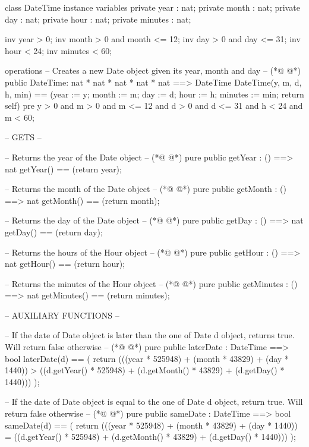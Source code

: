 \begin{vdmpp}[breaklines=true]
class DateTime
 instance variables
   private year : nat;
   private month : nat;
   private day : nat;
   private hour : nat;
   private minutes : nat;
   
   inv year > 0;
   inv month > 0 and month <= 12;
   inv day > 0 and day <= 31;
   inv hour < 24;
   inv minutes < 60;
   
 operations  
   -- Creates a new Date object given its year, month and day --
(*@
\label{DateTime:17}
@*)
   public DateTime: nat * nat * nat * nat * nat ==> DateTime
      DateTime(y, m, d, h, min) == (year := y; month := m; day := d; hour := h; minutes := min; return self)
      pre y > 0 and m > 0 and m <= 12 and d > 0 and d <= 31 and h < 24 and m < 60;
     
   -- GETS --
  
   -- Returns the year of the Date object --
(*@
\label{getYear:24}
@*)
   pure public getYear : () ==> nat
    getYear() == (return year); 
   
   -- Returns the month of the Date object --
(*@
\label{getMonth:28}
@*)
   pure public getMonth : () ==> nat
    getMonth() == (return month); 
   
   -- Returns the day of the Date object --
(*@
\label{getDay:32}
@*)
   pure public getDay : () ==> nat
    getDay() == (return day);

   -- Returns the hours of the Hour object --
(*@
\label{getHour:36}
@*)
   pure public getHour : () ==> nat
    getHour() == (return hour);
    
   -- Returns the minutes of the Hour object --
(*@
\label{getMinutes:40}
@*)
   pure public getMinutes : () ==> nat
    getMinutes() == (return minutes);
     

   -- AUXILIARY FUNCTIONS --
   
   -- If the date of Date object is later than the one of Date d object, returns true. Will return false otherwise -- 
(*@
\label{laterDate:47}
@*)
   pure public laterDate : DateTime ==> bool
    laterDate(d) == (
     return (((year * 525948) + (month * 43829)  + (day * 1440)) > ((d.getYear() * 525948) + (d.getMonth() * 43829) + (d.getDay() * 1440)))
    );
    
   -- If the date of Date object is equal to the one of Date d object, return true. Will return false otherwise --
(*@
\label{sameDate:53}
@*)
   pure public sameDate : DateTime ==> bool
    sameDate(d) == (
     return (((year * 525948) + (month * 43829)  + (day * 1440)) = ((d.getYear() * 525948) + (d.getMonth() * 43829) + (d.getDay() * 1440)))
    );
    

\end{vdmpp}
